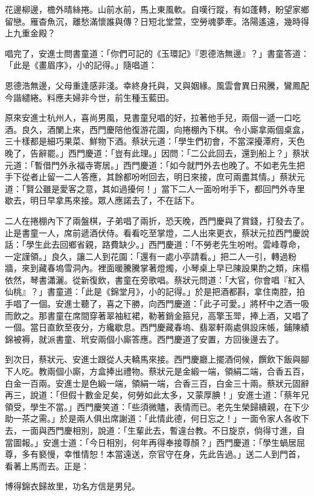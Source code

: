 \begin{showcontents}{}
花邊柳邊，檐外晴絲捲。山前水前，馬上東風軟。自嘆行蹤，有如蓬轉，盼望家鄉留戀。雁杳魚沉，離愁滿懷誰與傳？日短北堂萱，空勞魂夢牽。洛陽遙遠，幾時得上九重金殿？

唱完了，安進士問書童道：「你們可記的《玉環記》『恩德浩無邊』？」書童答道：「此是《畫眉序》，小的記得。」隨唱道：

恩德浩無邊，父母重逢感非淺。幸終身托與，又與姻緣。風雲會異日飛騰，鸞鳳配今諧繾綣。料應夫婦非今世，前生種玉藍田。

原來安進士杭州人，喜尚男風，見書童兒唱的好，拉著他手兒，兩個一遞一口吃酒。良久，酒闌上來，西門慶陪他復游花園，向捲棚內下棋。令小廝拿兩個桌盒，三十樣都是細巧果菜、鮮物下酒。蔡狀元道：「學生們初會，不當深擾潭府，天色晚了，告辭罷。」西門慶道：「豈有此理。」因問：「二公此回去，還到船上？」蔡狀元道：「暫借門外永福寺寄居。」西門慶道：「如今就門外去也晚了。不如老先生把手下從者止留一二人答應，其餘都吩咐回去，明日來接，庶可兩盡其情。」蔡狀元道：「賢公雖是愛客之意，其如過擾何！」當下二人一面吩咐手下，都回門外寺里歇去，明日早拿馬來接。眾人應諾去了，不在話下。

二人在捲棚內下了兩盤棋，子弟唱了兩折，恐天晚，西門慶與了賞錢，打發去了。止是書童一人，席前遞酒伏侍。看看吃至掌燈，二人出來更衣，蔡狀元拉西門慶說話：「學生此去回鄉省親，路費缺少。」西門慶道：「不勞老先生吩咐。雲峰尊命，一定謹領。」良久，讓二人到花園：「還有一處小亭請看。」把二人一引，轉過粉牆，來到藏春塢雪洞內。裡面暖騰騰掌著燈燭，小琴桌上早已陳設果酌之類，床榻依然，琴書瀟灑。從新復飲，書童在旁歌唱。蔡狀元問道：「大官，你會唱『紅入仙桃』？」書童道：「此是《錦堂月》，小的記得。」於是把酒都斟，拿住南腔，拍手唱了一個。安進士聽了，喜之下勝，向西門慶道：「此子可愛。」將杯中之酒一吸而飲之。那書童在席間穿著翠袖紅裙，勒著銷金箍兒，高擎玉斝，捧上酒，又唱了一個。當日直飲至夜分，方纔歇息。西門慶藏春塢、翡翠軒兩處俱設床帳，鋪陳績錦被褥，就派書童、玳安兩個小廝答應。西門慶道了安置，方回後邊去了。

到次日，蔡狀元、安進士跟從人夫轎馬來接。西門慶廳上擺酒伺候，饌飲下飯與腳下人吃。教兩個小廝，方盒捧出禮物。蔡狀元是金緞一端，領絹二端，合香五百，白金一百兩。安進士是色緞一端，領絹一端，合香三百，白金三十兩。蔡狀元固辭再三，說道：「但假十數金足矣，何勞如此太多，又蒙厚腆！」安進士道：「蔡年兄領受，學生不當。」西門慶笑道：「些須微贐，表情而已。老先生榮歸續親，在下少助一茶之需。」於是兩人俱出席謝道：「此情此德，何日忘之！」一面令家人各收下去，一面與西門慶相別，說道：「生輩此去，暫違台教。不日旋京，倘得寸進，自當圖報。」安進士道：「今日相別，何年再得奉接尊顏？」西門慶道：「學生蝸居屈尊，多有褻慢，幸惟情恕！本當遠送，奈官守在身，先此告過。」送二人到門首，看著上馬而去。正是：

博得錦衣歸故里，功名方信是男兒。


\end{showcontents}


